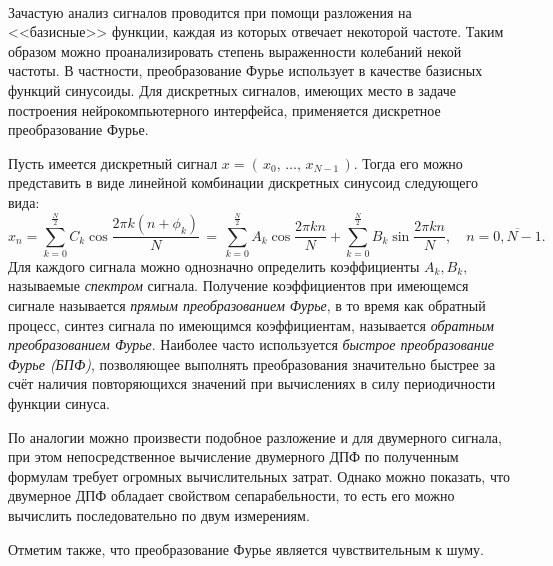 \documentclass[12pt,a4paper,oneside,fleqn,leqno]{article}
\newcounter{pe} %
\newcommand*{\Nep}{\addtocounter{pe}{1}{\arabic{pe}$^{\circ}$.\;}}
\newcommand*{\NepS}{\mbox{} \\ \Nep}
\begin{document}
	\NepS {\bf Преобразование Фурье}
	\par Зачастую анализ сигналов проводится при помощи разложения на <<базисные>> функции, каждая из которых отвечает некоторой частоте. Таким образом можно проанализировать степень выраженности колебаний некой частоты. В частности, преобразование Фурье использует в качестве базисных функций синусоиды. Для дискретных сигналов, имеющих место в задаче построения нейрокомпьютерного интерфейса, применяется дискретное преобразование Фурье.
	\par Пусть имеется дискретный сигнал $x = (\, x_0, \, \ldots, \, x_{N-1}\, )$. Тогда его можно представить в виде линейной комбинации дискретных синусоид следующего вида:
$$x_n = \sum_{k=0}^{\frac{N}{2}} C_k \cos{\frac{2 \pi k (n + \phi_k)}{N}}\, = \, \sum_{k=0}^{\frac{N}{2}} A_k \cos{\frac{2 \pi k n}{N}} + \sum_{k=0}^{\frac{N}{2}} B_k \sin{\frac{2 \pi k n}{N}}, \quad n = \overline{0, N-1}.$$
	Для каждого сигнала можно однозначно определить коэффициенты $A_k, B_k,$ называемые {\it спектром} сигнала. Получение коэффициентов при имеющемся сигнале называется {\it прямым преобразованием Фурье}, в то время как обратный процесс, синтез сигнала по имеющимся коэффициентам, называется {\it обратным преобразованием Фурье}. Наиболее часто используется {\it быстрое преобразование Фурье (БПФ)}, позволяющее выполнять преобразования значительно быстрее за счёт  наличия повторяющихся значений при вычислениях в силу периодичности функции синуса. 
	\par По аналогии можно произвести подобное разложение и для двумерного сигнала, при этом непосредственное вычисление двумерного ДПФ по полученным формулам требует огромных вычислительных затрат. Однако можно показать, что двумерное ДПФ обладает свойством сепарабельности, то есть его можно вычислить последовательно по двум измерениям. 
	\par Отметим также, что преобразование Фурье является чувствительным к шуму.
\end{document}
